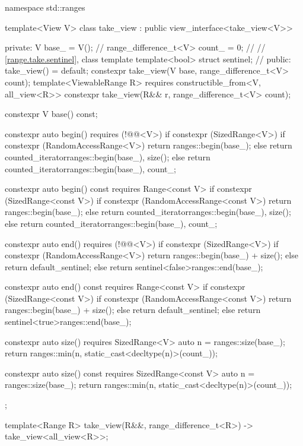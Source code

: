 \begin{codeblock}
namespace std::ranges {
  template<View V>
  class take_view : public view_interface<take_view<V>> {
  private:
    V base_ = V();                                      // \expos
    range_difference_t<V> count_ = 0;                   // \expos
    // \ref{range.take.sentinel}, class template 
    template<bool> struct sentinel;                     // \expos
  public:
    take_view() = default;
    constexpr take_view(V base, range_difference_t<V> count);
    template<ViewableRange R>
      requires constructible_from<V, all_view<R>>
    constexpr take_view(R&& r, range_difference_t<V> count);

    constexpr V base() const;

    constexpr auto begin() requires (!@@<V>) {
      if constexpr (SizedRange<V>) {
        if constexpr (RandomAccessRange<V>)
          return ranges::begin(base_);
        else
          return counted_iterator{ranges::begin(base_), size()};
      } else
        return counted_iterator{ranges::begin(base_), count_};
    }

    constexpr auto begin() const requires Range<const V> {
      if constexpr (SizedRange<const V>) {
        if constexpr (RandomAccessRange<const V>)
          return ranges::begin(base_);
        else
          return counted_iterator{ranges::begin(base_), size()};
      } else
        return counted_iterator{ranges::begin(base_), count_};
    }

    constexpr auto end() requires (!@@<V>) {
      if constexpr (SizedRange<V>) {
        if constexpr (RandomAccessRange<V>)
          return ranges::begin(base_) + size();
        else
          return default_sentinel;
      } else
        return sentinel<false>{ranges::end(base_)};
    }

    constexpr auto end() const requires Range<const V> {
      if constexpr (SizedRange<const V>) {
        if constexpr (RandomAccessRange<const V>)
          return ranges::begin(base_) + size();
        else
          return default_sentinel;
      } else
        return sentinel<true>{ranges::end(base_)};
    }

    constexpr auto size() requires SizedRange<V> {
      auto n = ranges::size(base_);
      return ranges::min(n, static_cast<decltype(n)>(count_));
    }

    constexpr auto size() const requires SizedRange<const V> {
      auto n = ranges::size(base_);
      return ranges::min(n, static_cast<decltype(n)>(count_));
    }
  };

  template<Range R>
    take_view(R&&, range_difference_t<R>)
      -> take_view<all_view<R>>;
}
\end{codeblock}

